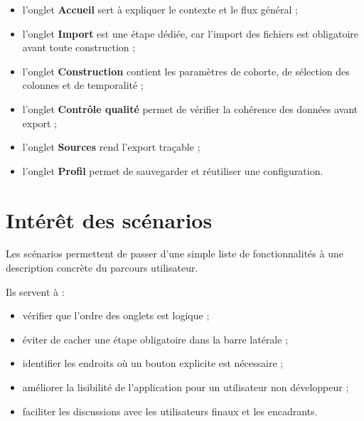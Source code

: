 \documentclass[11pt,a4paper]{article}
\begin{document}
\begin{itemize}
    \item l'onglet \textbf{Accueil} sert à expliquer le contexte et le flux général ;
    \item l'onglet \textbf{Import} est une étape dédiée, car l'import des fichiers est obligatoire avant toute construction ;
    \item l'onglet \textbf{Construction} contient les paramètres de cohorte, de sélection des colonnes et de temporalité ;
    \item l'onglet \textbf{Contrôle qualité} permet de vérifier la cohérence des données avant export ;
    \item l'onglet \textbf{Sources} rend l'export traçable ;
    \item l'onglet \textbf{Profil} permet de sauvegarder et réutiliser une configuration.
\end{itemize}

\section{Intérêt des scénarios}

Les scénarios permettent de passer d'une simple liste de fonctionnalités à une
description concrète du parcours utilisateur.

Ils servent à :

\begin{itemize}
    \item vérifier que l'ordre des onglets est logique ;
    \item éviter de cacher une étape obligatoire dans la barre latérale ;
    \item identifier les endroits où un bouton explicite est nécessaire ;
    \item améliorer la lisibilité de l'application pour un utilisateur non développeur ;
    \item faciliter les discussions avec les utilisateurs finaux et les encadrants.
\end{itemize}
\end{document}
